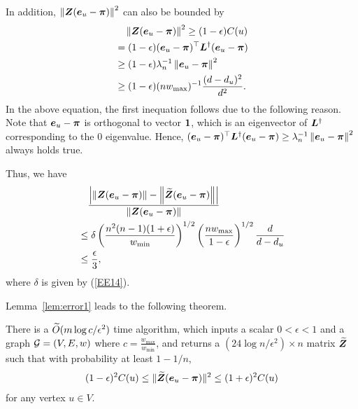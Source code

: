 \documentclass[10pt,twocolumn,twoside]{IEEEtran}
\begin{document}
\begin{IEEEproof}
    In addition, \(\left\Vert\boldsymbol{Z} (\boldsymbol{e}_u - \boldsymbol{\pi})\right\Vert^2\) can also be bounded by
    \begin{equation}\label{EE17}
        \begin{split}  \notag
            &\quad\left\Vert\boldsymbol{Z} (\boldsymbol{e}_u - \boldsymbol{\pi})\right\Vert^2
            \geq
            (1 - \epsilon) C(u) \\
            &=(1-\epsilon)(\boldsymbol{e}_u-\boldsymbol{\pi})^{\top} \boldsymbol{L}^{\dagger} (\boldsymbol{e}_u-\boldsymbol{\pi}) \\
            &\geq (1-\epsilon)\lambda_{n}^{-1} \left\Vert\boldsymbol{e}_u-\boldsymbol{\pi}\right\Vert^2 \\
            &	\geq (1-\epsilon)(n w_{\max})^{-1} \frac{(d-d_u)^2}{d^2}.
        \end{split}
    \end{equation}
    In the above equation, the first inequation follows due to the following reason.   Note that \(\boldsymbol{e}_u-\boldsymbol{\pi}\) is orthogonal to  vector \(\boldsymbol{1}\), which is an eigenvector of \(\boldsymbol{L}^{\dagger}\) corresponding to the \(0\) eigenvalue. Hence, \((\boldsymbol{e}_u-\boldsymbol{\pi})^{\top} \boldsymbol{L}^{\dagger} (\boldsymbol{e}_u-\boldsymbol{\pi}) \ge \lambda_{n}^{-1} \left\Vert\boldsymbol{e}_u-\boldsymbol{\pi}\right\Vert^2\) always holds true.

    Thus, we have
    \begin{align*}
         & \quad \frac{
            \left| \left\Vert\boldsymbol{Z} (\boldsymbol{e}_{u} - \boldsymbol{\pi})\right\Vert -  \left\Vert\widetilde{\boldsymbol{Z}}  (\boldsymbol{e}_{u} - \boldsymbol{\pi})\right\Vert \right|
        }{
            \left\Vert\boldsymbol{Z} (\boldsymbol{e}_{u} - \boldsymbol{\pi})\right\Vert
        }                                                 \\
         & \le
        \delta \left(\frac{n^2(n-1) (1+\epsilon)}{w_{\min}}\right)^{1/2}\left(\frac{n
        w_{\max}}{1-\epsilon}\right)^{1/2}\frac{d}{d-d_u} \\
         & \le \frac{\epsilon}{3},
    \end{align*}
    where \(\delta\) is given by (\ref{EE14}).
\end{IEEEproof}

Lemma~\ref{lem:error1} leads to the following theorem.
\begin{theorem}
    \label{TheoAlg1}
    There is a \(\widetilde{O}(m\log{c}/\epsilon^2)\) time algorithm, which  inputs  a scalar \(0<\epsilon<1\) and a graph \(\mathcal{G}=(V,E,w)\) where \(c=\frac{w_{\max}}{w_{\min}}\), and returns a \((24\log n/\epsilon^2)\times n\) matrix \(\widetilde{\boldsymbol{Z}}\) such that with probability at least \(1-1/n\),
    \begin{align}
        (1-\epsilon)^2  C(u) \leq \|\widetilde{\boldsymbol{Z}}(\boldsymbol{e}_u-\boldsymbol{\pi})\|^2 \leq (1+\epsilon)^2  C(u)\nonumber
    \end{align}
    for any vertex \(u \in V\).
\end{theorem}
\end{document}
